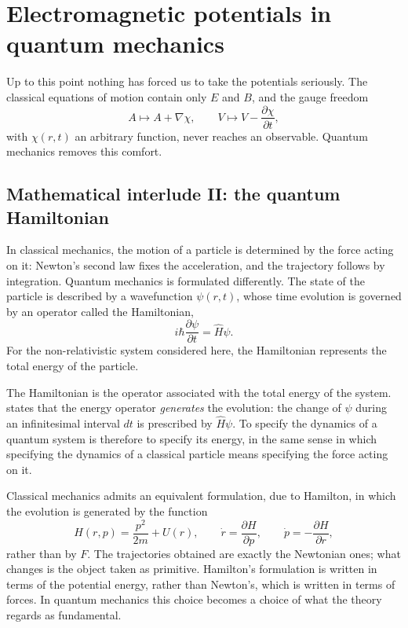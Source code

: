 \section{Electromagnetic potentials in quantum mechanics}

Up to this point nothing has forced us to take the potentials seriously. The
classical equations of motion contain only \(E\) and \(B\), and the gauge
freedom
\[
	A \longmapsto A + \nabla \chi, \qquad V \longmapsto V -
	\frac{\partial \chi}{\partial t},
\]
with \(\chi(r,t)\) an arbitrary function, never reaches an observable.
Quantum mechanics removes this comfort.

\subsection{Mathematical interlude II: the quantum Hamiltonian}

In classical mechanics, the motion of a particle is determined by the force
acting on it: Newton's second law fixes the acceleration, and the
trajectory follows by integration.
Quantum mechanics is formulated differently. The state of the particle
is described by a wavefunction \(\psi(r,t)\), whose time evolution is
governed by an operator called the Hamiltonian,
\begin{equation}
	i \hbar \frac{\partial \psi}{\partial t} = \hat H \psi .
	\label{eq:schrodinger}
\end{equation}
For the non-relativistic system considered here, the Hamiltonian
represents the total energy of the particle.



The Hamiltonian is the operator associated with the total energy of the
system. 
states that the energy operator \emph{generates} the evolution:
the change of \(\psi\) during an infinitesimal interval \(dt\) is
prescribed by \(\hat H \psi\). To specify the dynamics of a quantum system is
therefore to specify its energy, in the same sense in which specifying the
dynamics of a classical particle means specifying the force acting on it.


Classical mechanics admits an equivalent formulation, due to Hamilton, in
which the evolution is generated by the function
\vspace{-5pt}
\[
	H (r, p) = \frac{p^2}{2m}+ U(r), \qquad \dot r =
	\frac{\partial H}{\partial p}, \qquad
	\dot p = - \frac{\partial H}{\partial r},
\]
rather than by \(F\). The trajectories obtained are exactly the Newtonian ones;
what changes is the object taken as primitive. Hamilton's formulation is
written in terms of the potential energy, rather than Newton's, which is
written in terms of forces. In quantum mechanics this choice becomes a choice of
what the theory regards as fundamental.


